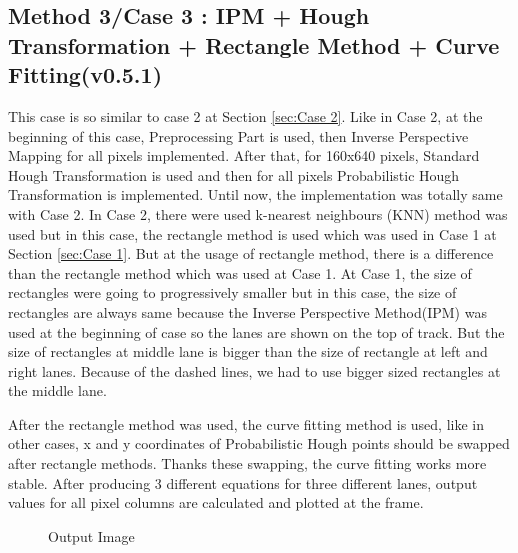 \subsection{Method 3/Case 3 : IPM + Hough Transformation + Rectangle Method + Curve Fitting(v0.5.1)}\label{sec:Case 3}

This case is so similar to case 2 at Section \ref{sec:Case 2}. Like in Case 2, at the beginning of this case, Preprocessing Part is used, then Inverse Perspective Mapping for all pixels implemented. After that, for 160x640 pixels, Standard Hough Transformation is used and then for all pixels Probabilistic Hough Transformation is implemented. Until now, the implementation was totally same with Case 2. In Case 2, there were used k-nearest neighbours (KNN) method was used but in this case, the rectangle method is used which was used in Case 1 at Section \ref{sec:Case 1}. But at the usage of rectangle method, there is a difference than the rectangle method which was used at Case 1. At Case 1, the size of rectangles were going to progressively smaller but in this case, the size of rectangles are always same because the Inverse Perspective Method(IPM) was used at the beginning of case so the lanes are shown on the top of track. But the size of rectangles at middle lane is bigger than the size of rectangle at left and right lanes. Because of the dashed lines, we had to use bigger sized rectangles at the middle lane.

After the rectangle method was used,  the curve fitting method is used, like in other cases, x and y coordinates of Probabilistic Hough points should be swapped after rectangle methods. Thanks these swapping, the curve fitting works more stable. After producing 3 different equations for three different lanes, output values for all pixel columns are calculated and plotted at the frame. 

\begin{figure}[H]
  \centering
  \caption{Output Image}
\end{figure}


